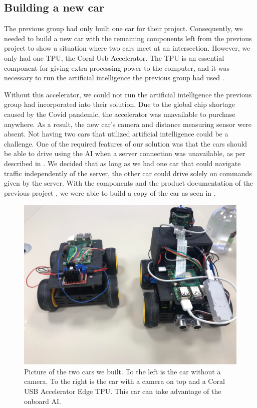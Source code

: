 \subsection{Building a new car}
The previous group had only built one car for their project. Consequently, we needed to build a new car with the remaining components left from the previous project to show a situation where two cars meet at an intersection. However, we only had one TPU, the Coral Usb Accelerator. The TPU is an essential component for giving extra processing power to the computer, and it was necessary to run the artificial intelligence the previous group had used \parencite{prev_project}. 

Without this accelerator, we could not run the artificial intelligence the previous group had incorporated into their solution. Due to the global chip shortage caused by the Covid pandemic, the accelerator was unavailable to purchase anywhere. As a result, the new car's camera and distance measuring sensor were absent. Not having two cars that utilized artificial intelligence could be a challenge. One of the required features of our solution was that the cars should be able to drive using the AI when a server connection was unavailable, as per described in . We decided that as long as we had one car that could navigate traffic independently of the server, the other car could drive solely on commands given by the server. With the components and the product documentation of the previous project , we were able to build a copy of the car as seen in .

\begin{figure}[h!]
	\centering
	\includegraphics[width=0.9\linewidth]{figures/two_cars}
	\caption{Picture of the two cars we built. To the left is the car without a camera. To the right is the car with a camera on top and a Coral USB Accelerator Edge TPU. This car can take advantage of the onboard AI.}
	\label{fig:twocars}
\end{figure}



